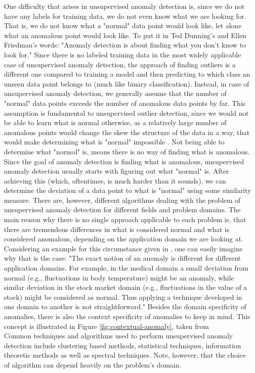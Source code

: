 \documentclass{vldb}
\begin{document}
One difficulty that arises in unsupervised anomaly detection is, since we do not have any labels for training data, we do not even know what we are looking for. That is, we do not know what a "normal" data point would look like, let alone what an anomalous point would look like. To put it in Ted Dunning's and Ellen Friedman's words: "Anomaly detection is about finding what you don't know to look for." \cite{book:mapr} 
Since there is no labeled training data in the most widely applicable case of unsupervised anomaly detection, the approach of finding outliers is a different one compared to training a model and then predicting to which class an unseen data point belongs to (much like binary classification). Instead, in case of unsupervised anomaly detection, we generally assume that the number of "normal" data points exceeds the number of anomalous data points by far.\cite{survey:anomaly-detection} This assumption is fundamental to unsupervised outlier detection, since we would not be able to learn what is normal otherwise, as a relatively large number of anomalous points would change the skew the structure of the data in a way, that would make determining what is "normal" impossible . Not being able to determine what "normal" is, means there is no way of finding what is anomalous. Since the goal of anomaly detection is finding what is anomalous, unsupervised anomaly detection usually starts with figuring out what "normal" is. After achieving this (which, oftentimes, is much harder than it sounds), we can determine the deviation of a data point to what is "normal" using some similarity measure. There are, however, different algorithms dealing with the problem of unsupervised anomaly detection for different fields and problem domains. The main reason why there is no single approach applicable to each problem is, that there are tremendous differences in what is considered normal and what is considered anomalous, depending on the application domain we are looking at. Considering an example for this circumstance given in \cite{survey:anomaly-detection}, one can easily imagine why that is the case: "The exact notion of an anomaly is different for different application domains. For example, in the medical domain a small deviation from normal (e.g., fluctuations in body temperature) might be an anomaly, while similar deviation in the stock market domain (e.g., fluctuations in the value of a stock) might be considered as normal. Thus applying a technique developed in one domain to another is not straightforward." Besides the domain specificity of anomalies, there is also the context specificity of anomalies to keep in mind. This concept is illustrated in Figure \ref{fig:contextual-anomaly}, taken from \cite{book:mapr} \\
Common techniques and algorithms used to perform unsupervised anomaly detection include clustering based methods, statistical techniques, information theoretic methods as well as spectral techniques. Note, however, that the choice of algorithm can depend heavily on the problem's domain.
\end{document}
